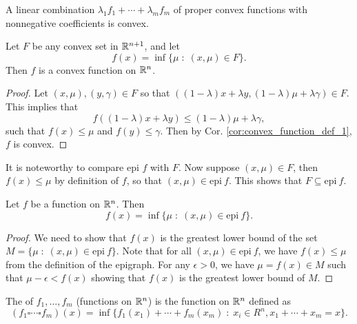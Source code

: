 \documentclass[11pt,a4paper]{article}
\begin{document}
\begin{corollary}
    A linear combination $\lambda_1 f_1+\cdots + \lambda_m f_m$ of proper convex functions with nonnegative coefficients is convex.
\end{corollary}

\begin{theorem}\label{thm:convex_set_inf_convex_function}
    Let $F$ be any convex set in $\mathbb{R}^{n+1}$, and let 
    \begin{equation*}
        f(x) = \inf\{\mu\;:\;(x,\mu)\in F\}.
    \end{equation*}
    Then $f$ is a convex function on $\mathbb{R}^n$.
\end{theorem}

\begin{proof}
    Let $(x,\mu),(y,\gamma)\in F$ so that $((1-\lambda)x+\lambda y, (1-\lambda)\mu+\lambda \gamma)\in F$. This implies that
    \begin{equation}\label{eqn:}
        f((1-\lambda)x+\lambda y) \le (1-\lambda)\mu+\lambda \gamma,
    \end{equation} 
    such that $f(x)\le \mu$ and $f(y)\le \gamma$. Then by Cor. \ref{cor:convex_function_def_1}, $f$ is convex.
\end{proof}

\begin{remark}
    It is noteworthy to compare epi $f$ with $F$. Now suppose $(x,\mu)\in F$, then $f(x)\le \mu$ by definition of $f$, so that $(x,\mu)\in \text{epi}\ f$. This shows that $F\subseteq \text{epi}\ f$. 
\end{remark}

\begin{proposition}\label{prop:f_inf_epi_f}
    Let $f$ be a function on $\mathbb{R}^n$. Then
    \begin{equation*}
        f(x) = \inf \{\mu\;:\;(x,\mu)\in \text{epi}\ f\}.
    \end{equation*}
\end{proposition}

\begin{proof}
    We need to show that $f(x)$ is the greatest lower bound of the set $M = \{\mu\;:\;(x,\mu)\in \text{epi}\ f\}$. Note that for all $(x,\mu)\in \text{epi}\ f$, we have $f(x)\le \mu$ from the definition of the epigraph. For any $\epsilon>0$, we have $\mu = f(x)\in M$ such that $\mu-\epsilon<f(x)$ showing that $f(x)$ is the greatest lower bound of $M$.
\end{proof}

\begin{definition}
    The  of $f_1,\ldots,f_m$ (functions on $\mathbb{R}^n$) is the function on $\mathbb{R}^n$ defined as 
    \begin{equation*}
        (f_1\square \cdots \square f_m)(x) = \inf\{f_1(x_1)+\cdots + f_m(x_m)\;:\;x_i\in R^n,x_1+\cdots+x_m = x\}.
    \end{equation*} 
\end{definition}
\end{document}
